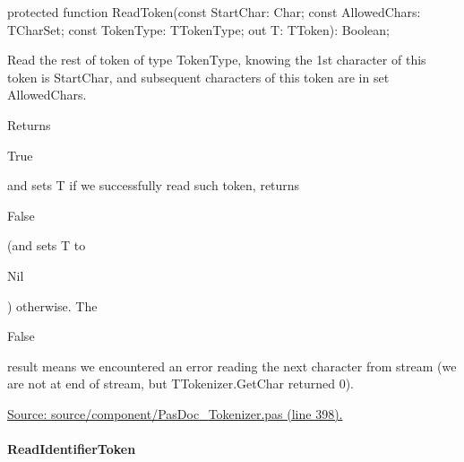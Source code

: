 \documentclass{report}
\newif\ifpdf
\begin{document}
\label{PasDoc_Tokenizer.TTokenizer-ReadToken}
\begin{list}{}{
\setlength{\itemindent}{0cm}
\setlength{\listparindent}{0cm}
\setlength{\leftmargin}{\evensidemargin}
\addtolength{\leftmargin}{\tmplength}
\settowidth{\labelsep}{X}
\addtolength{\leftmargin}{\labelsep}
\setlength{\labelwidth}{\tmplength}
}
\item[\textbf{Declaration}\hfill]
\ifpdf
\begin{flushleft}
\fi
\begin{ttfamily}
protected function ReadToken(const StartChar: Char; const AllowedChars: TCharSet; const TokenType: TTokenType; out T: TToken): Boolean;\end{ttfamily}

\ifpdf
\end{flushleft}
\fi

\par
\item[\textbf{Description}]
Read the rest of token of type TokenType, knowing the 1st character of this token is StartChar, and subsequent characters of this token are in set AllowedChars.

Returns \begin{ttfamily}True\end{ttfamily} and sets T if we successfully read such token, returns \begin{ttfamily}False\end{ttfamily} (and sets T to \begin{ttfamily}Nil\end{ttfamily}) otherwise. The \begin{ttfamily}False\end{ttfamily} result means we encountered an error reading the next character from stream (we are not at end of stream, but TTokenizer.GetChar returned 0).\par
\href{https://github.com/pasdoc/pasdoc/blob/master/source/component/PasDoc_Tokenizer.pas#L398}{Source: source/component/PasDoc{\_}Tokenizer.pas (line 398).}

\end{list}
\paragraph*{ReadIdentifierToken}\hspace*{\fill}
\end{document}
